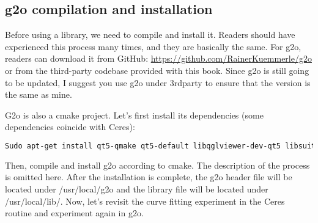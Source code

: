 \subsection{g2o compilation and installation}

Before using a library, we need to compile and install it. Readers should have experienced this process many times, and they are basically the same. For g2o, readers can download it from GitHub: \url{https://github.com/RainerKuemmerle/g2o} or from the third-party codebase provided with this book. Since g2o is still going to be updated, I suggest you use g2o under 3rdparty to ensure that the version is the same as mine.

G2o is also a cmake project. Let's first install its dependencies (some dependencies coincide with Ceres):

\begin{lstlisting}[language=sh,caption=terminal input:]
Sudo apt-get install qt5-qmake qt5-default libqglviewer-dev-qt5 libsuitesparse-dev libcxsparse3 libcholmod3
\end{lstlisting}

Then, compile and install g2o according to cmake. The description of the process is omitted here. After the installation is complete, the g2o header file will be located under /usr/local/g2o and the library file will be located under /usr/local/lib/. Now, let's revisit the curve fitting experiment in the Ceres routine and experiment again in g2o.

